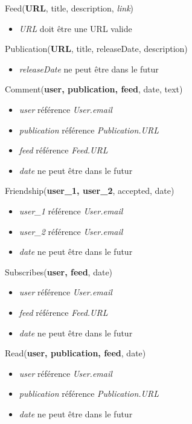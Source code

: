 \documentclass[a4paper,10pt]{article}
\begin{document}
        Feed(\textbf{URL}, title, description, \textit{link})
            \begin{itemize}
            \item \textit{URL} doit être une URL valide
	    \end{itemize}
        
        Publication(\textbf{URL}, title, releaseDate, description)
        \begin{itemize}            
            \item \textit{releaseDate} ne peut être dans le futur
        \end{itemize}

        Comment(\textbf{user, publication, feed}, date, text)
        \begin{itemize}
            \item \textit{user} référence \textit{User.email}
            \item \textit{publication} référence \textit{Publication.URL}
            \item \textit{feed} référence \textit{Feed.URL}
            \item \textit{date} ne peut être dans le futur
        \end{itemize}
        
        Friendship(\textbf{user\_1, user\_2}, accepted, date)
        \begin{itemize}            
            \item \textit{user\_1} référence \textit{User.email}
            \item \textit{user\_2} référence \textit{User.email}
            \item \textit{date} ne peut être dans le futur
        \end{itemize}

        Subscribes(\textbf{user, feed}, date)
        \begin{itemize}            
            \item \textit{user} référence \textit{User.email}
            \item \textit{feed} référence \textit{Feed.URL}
            \item \textit{date} ne peut être dans le futur
        \end{itemize}

        Read(\textbf{user, publication, feed}, date)
        \begin{itemize}            
            \item \textit{user} référence \textit{User.email}
            \item \textit{publication} référence \textit{Publication.URL}
            \item \textit{date} ne peut être dans le futur
        \end{itemize}
            
\end{document}
